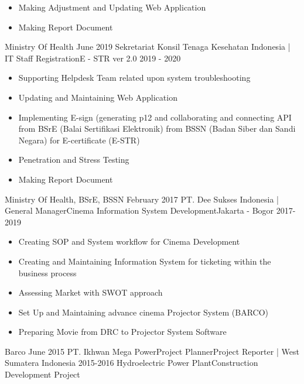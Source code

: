 \begin{experiences}
{\begin{itemize}
                        \item Making Adjustment and Updating Web Application               
                        \item Making Report Document                                                                   
                      \end{itemize}
                    }
                    {Ministry Of Health}
  \emptySeparator
  \experience
    {June 2019} {Sekretariat Konsil Tenaga Kesehatan Indonesia | IT Staff }{Registration}{E - STR ver 2.0}
    {2019 - 2020}    {
                      \begin{itemize}
                        \item Supporting Helpdesk Team related upon system troubleshooting                          
                        \item Updating and Maintaining Web Application                     
                        \item Implementing E-sign (generating p12 and collaborating and connecting API from BSrE (Balai Sertifikasi Elektronik) from BSSN (Badan Siber dan Sandi Negara) for E-certificate (E-STR) 
                        \item Penetration and Stress Testing 
                        \item Making Report Document                                                                   
                      \end{itemize}
                    }
                    {Ministry Of Health, BSrE, BSSN}
  \emptySeparator
  \experience
    {February 2017}     {PT. Dee Sukses Indonesia | General Manager}{Cinema Information System Development}{Jakarta - Bogor}
    {2017-2019}    {
                      \begin{itemize}
                        \item Creating SOP and System workflow for Cinema Development
                        \item Creating and Maintaining Information System for ticketing within the business process                
                        \item Assessing Market with SWOT approach               
                        \item Set Up and Maintaining advance cinema Projector System (BARCO)                        
                        \item Preparing Movie from DRC to Projector System Software                                                  
                      \end{itemize}
                    }
                    {Barco}
  \emptySeparator
  \consultantexperience
  {June 2015}       {PT. Ikhwan Mega Power}{Project Planner}{Project Reporter | West Sumatera Indonesia}
  {2015-2016}      {Hydroelectric Power Plant}{Construction Development Project}
                    {
        
}
\end{experiences}
